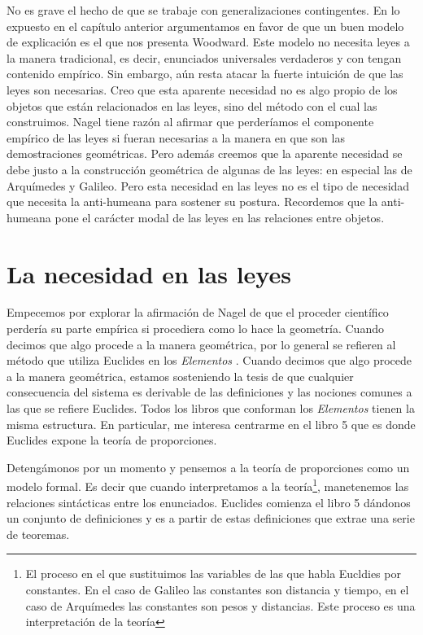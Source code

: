 No es grave el hecho de que se trabaje con generalizaciones contingentes. En lo expuesto en el capítulo anterior argumentamos en favor de que un buen modelo de explicación es el que nos presenta Woodward. Este modelo no necesita leyes a la manera tradicional, es decir, enunciados universales verdaderos y con tengan contenido empírico. Sin embargo, aún resta atacar la fuerte intuición de que las leyes son necesarias. Creo que esta aparente necesidad no es algo propio de los objetos que están relacionados en las leyes, sino del método con el cual las construimos. Nagel tiene razón al afirmar que perderíamos el componente empírico de las leyes si fueran necesarias a la manera en que son las demostraciones geométricas. Pero además creemos que la aparente necesidad se debe justo a la construcción geométrica de algunas de las leyes: en especial las de Arquímedes y Galileo. Pero esta necesidad en las leyes no es el tipo de necesidad que necesita la anti-humeana para sostener su postura. Recordemos que la anti-humeana pone el carácter modal de las leyes en las relaciones entre objetos.

\section{La necesidad en las leyes}

\noindent Empecemos por explorar la afirmación de Nagel de que el proceder científico perdería su parte empírica si procediera como lo hace la geometría. Cuando decimos que algo procede a la manera geométrica, por lo general se refieren al método que utiliza Euclides en los \emph{Elementos} \cite{Euclid2008}. Cuando decimos que algo procede a la manera geométrica, estamos sosteniendo la tesis de que cualquier consecuencia del sistema es derivable de las definiciones y las nociones comunes a las que se refiere Euclides. Todos los libros que conforman los \emph{Elementos} tienen la misma estructura. En particular, me interesa centrarme en el libro 5 que es donde Euclides expone la teoría de proporciones.

Detengámonos por un momento y pensemos a la teoría de proporciones como un modelo formal. Es decir que cuando interpretamos a la teoría\footnote{El proceso en el que sustituimos las variables de las que habla Eucldies por constantes. En el caso de Galileo las constantes son distancia y tiempo, en el caso de Arquímedes las constantes son pesos y distancias. Este proceso es una interpretación de la teoría}, manetenemos las relaciones sintácticas entre los enunciados. Euclides comienza el libro 5 dándonos un conjunto de definiciones y es a partir de estas definiciones que extrae una serie de teoremas.

